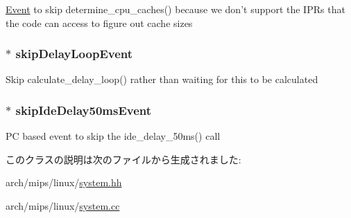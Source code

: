 \label{classLinuxMipsSystem_aa2dee1f9674e5ea129c2c31d05ce6412}
\hyperlink{classEvent}{Event} to skip determine\_\-cpu\_\-caches() because we don't support the IPRs that the code can access to figure out cache sizes \hypertarget{classLinuxMipsSystem_a9cab420f2dc7381c4c07941ff49c8167}{
\subsubsection[{skipDelayLoopEvent}]{$\ast$ {\bf skipDelayLoopEvent}}}
\label{classLinuxMipsSystem_a9cab420f2dc7381c4c07941ff49c8167}
Skip calculate\_\-delay\_\-loop() rather than waiting for this to be calculated \hypertarget{classLinuxMipsSystem_accb807c7d7a32466eb9f7ddf7e07d582}{
\subsubsection[{skipIdeDelay50msEvent}]{$\ast$ {\bf skipIdeDelay50msEvent}}}
\label{classLinuxMipsSystem_accb807c7d7a32466eb9f7ddf7e07d582}
PC based event to skip the ide\_\-delay\_\-50ms() call 

このクラスの説明は次のファイルから生成されました:\begin{DoxyCompactItemize}
\item 
arch/mips/linux/\hyperlink{arch_2mips_2linux_2system_8hh}{system.hh}\item 
arch/mips/linux/\hyperlink{arch_2mips_2linux_2system_8cc}{system.cc}\end{DoxyCompactItemize}
